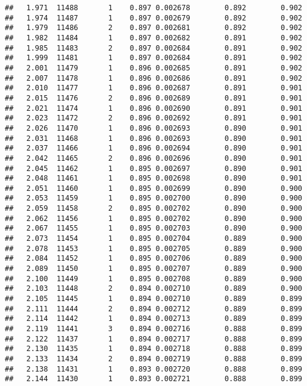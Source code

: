 \documentclass[
]{book}
\begin{document}
\begin{verbatim}
##   1.971  11488       1    0.897 0.002678        0.892        0.902
##   1.974  11487       1    0.897 0.002679        0.892        0.902
##   1.979  11486       2    0.897 0.002681        0.892        0.902
##   1.982  11484       1    0.897 0.002682        0.891        0.902
##   1.985  11483       2    0.897 0.002684        0.891        0.902
##   1.999  11481       1    0.897 0.002684        0.891        0.902
##   2.001  11479       1    0.896 0.002685        0.891        0.902
##   2.007  11478       1    0.896 0.002686        0.891        0.902
##   2.010  11477       1    0.896 0.002687        0.891        0.901
##   2.015  11476       2    0.896 0.002689        0.891        0.901
##   2.021  11474       1    0.896 0.002690        0.891        0.901
##   2.023  11472       2    0.896 0.002692        0.891        0.901
##   2.026  11470       1    0.896 0.002693        0.890        0.901
##   2.031  11468       1    0.896 0.002693        0.890        0.901
##   2.037  11466       1    0.896 0.002694        0.890        0.901
##   2.042  11465       2    0.896 0.002696        0.890        0.901
##   2.045  11462       1    0.895 0.002697        0.890        0.901
##   2.048  11461       1    0.895 0.002698        0.890        0.901
##   2.051  11460       1    0.895 0.002699        0.890        0.900
##   2.053  11459       1    0.895 0.002700        0.890        0.900
##   2.059  11458       2    0.895 0.002702        0.890        0.900
##   2.062  11456       1    0.895 0.002702        0.890        0.900
##   2.067  11455       1    0.895 0.002703        0.890        0.900
##   2.073  11454       1    0.895 0.002704        0.889        0.900
##   2.078  11453       1    0.895 0.002705        0.889        0.900
##   2.084  11452       1    0.895 0.002706        0.889        0.900
##   2.089  11450       1    0.895 0.002707        0.889        0.900
##   2.100  11449       1    0.895 0.002708        0.889        0.900
##   2.103  11448       2    0.894 0.002710        0.889        0.900
##   2.105  11445       1    0.894 0.002710        0.889        0.899
##   2.111  11444       2    0.894 0.002712        0.889        0.899
##   2.114  11442       1    0.894 0.002713        0.889        0.899
##   2.119  11441       3    0.894 0.002716        0.888        0.899
##   2.122  11437       1    0.894 0.002717        0.888        0.899
##   2.130  11435       1    0.894 0.002718        0.888        0.899
##   2.133  11434       2    0.894 0.002719        0.888        0.899
##   2.138  11431       1    0.893 0.002720        0.888        0.899
##   2.144  11430       1    0.893 0.002721        0.888        0.899

\end{verbatim}
\end{document}
